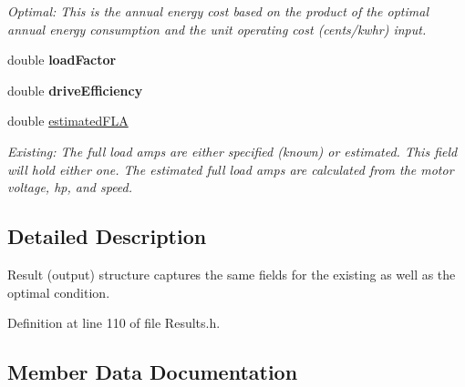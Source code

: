 \begin{DoxyCompactItemize}
\begin{DoxyCompactList}\small\item\em Optimal\+: This is the annual energy cost based on the product of the optimal annual energy consumption and the unit operating cost (cents/kwhr) input. \end{DoxyCompactList}\item 
\mbox{\label{struct_p_s_a_t_result_1_1_output_a6aedb507b4a61c9fb8c4fa2b748a3148}} 
double {\bfseries load\+Factor}
\item 
\mbox{\label{struct_p_s_a_t_result_1_1_output_af0a3a6a147a574a10e50417b02fed6be}} 
double {\bfseries drive\+Efficiency}
\item 
\mbox{\label{struct_p_s_a_t_result_1_1_output_af1d2f5dce8902351c00cdc2d5da0e34c}} 
double \hyperlink{struct_p_s_a_t_result_1_1_output_af1d2f5dce8902351c00cdc2d5da0e34c}{estimated\+F\+LA}
\begin{DoxyCompactList}\small\item\em Existing\+: The full load amps are either specified (known) or estimated. This field will hold either one. The estimated full load amps are calculated from the motor voltage, hp, and speed. \end{DoxyCompactList}\end{DoxyCompactItemize}


\subsection{Detailed Description}
Result (output) structure captures the same fields for the existing as well as the optimal condition. 

Definition at line 110 of file Results.\+h.



\subsection{Member Data Documentation}
\mbox{\label{struct_p_s_a_t_result_1_1_output_a222e9c8df8c99f87abe372cad138d5f4}} 
